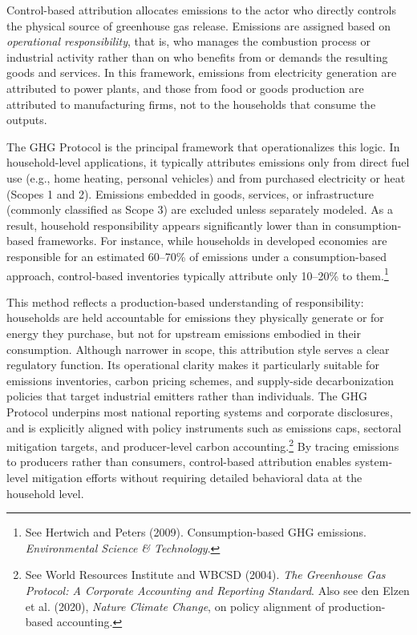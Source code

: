 \documentclass[12pt,a4paper]{article}%
\begin{document}
Control-based attribution allocates emissions to the actor who directly controls the physical source of greenhouse gas release. Emissions are assigned based on \textit{operational responsibility}, that is, who manages the combustion process or industrial activity rather than on who benefits from or demands the resulting goods and services. In this framework, emissions from electricity generation are attributed to power plants, and those from food or goods production are attributed to manufacturing firms, not to the households that consume the outputs.

The GHG Protocol is the principal framework that operationalizes this logic. In household-level applications, it typically attributes emissions only from direct fuel use (e.g., home heating, personal vehicles) and from purchased electricity or heat (Scopes 1 and 2). Emissions embedded in goods, services, or infrastructure (commonly classified as Scope 3) are excluded unless separately modeled. As a result, household responsibility appears significantly lower than in consumption-based frameworks. For instance, while households in developed economies are responsible for an estimated 60–70\% of emissions under a consumption-based approach, control-based inventories typically attribute only 10–20\% to them.\footnote{See Hertwich and Peters (2009). Consumption-based GHG emissions. \textit{Environmental Science \& Technology}.}

This method reflects a production-based understanding of responsibility: households are held accountable for emissions they physically generate or for energy they purchase, but not for upstream emissions embodied in their consumption. Although narrower in scope, this attribution style serves a clear regulatory function. Its operational clarity makes it particularly suitable for emissions inventories, carbon pricing schemes, and supply-side decarbonization policies that target industrial emitters rather than individuals. The GHG Protocol underpins most national reporting systems and corporate disclosures, and is explicitly aligned with policy instruments such as emissions caps, sectoral mitigation targets, and producer-level carbon accounting.\footnote{See World Resources Institute and WBCSD (2004). \textit{The Greenhouse Gas Protocol: A Corporate Accounting and Reporting Standard}. Also see den Elzen et al. (2020), \textit{Nature Climate Change}, on policy alignment of production-based accounting.} By tracing emissions to producers rather than consumers, control-based attribution enables system-level mitigation efforts without requiring detailed behavioral data at the household level.
\end{document}
